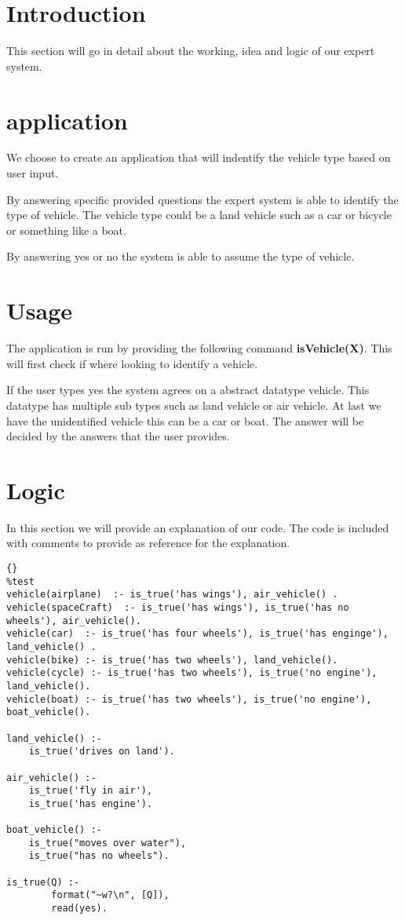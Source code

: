 \section{Introduction} \label{man-introduction}
This section will go in detail about the working, idea and logic of our expert system.

\section{application} \label{man-application}
We choose to create an application that will indentify the vehicle type based on user input.

By answering specific provided questions the expert system is able to identify the type of vehicle.
The vehicle type could be a land vehicle such as a car or bicycle or something like a boat.

By answering yes or no the system is able to assume the type of vehicle.


\section{Usage} \label{man-usage}
The application is run by providing the following command \textbf{isVehicle(X)}.
This will first check if where looking to identify a vehicle.

If the user types yes the system agrees on a abstract datatype vehicle.
This datatype has multiple sub types such as land vehicle or air vehicle. At last we have the unidentified
vehicle this can be a car or boat.
The answer will be decided by the answers that the user provides.

\newpage
\section{Logic} \label{man-logic}
In this section we will provide an explanation of our code.
The code is included with comments to provide as reference for the explanation.




\begin{lstlisting}{}
%test
vehicle(airplane)  :- is_true('has wings'), air_vehicle() .
vehicle(spaceCraft)  :- is_true('has wings'), is_true('has no wheels'), air_vehicle().
vehicle(car)  :- is_true('has four wheels'), is_true('has enginge'), land_vehicle() .
vehicle(bike) :- is_true('has two wheels'), land_vehicle().
vehicle(cycle) :- is_true('has two wheels'), is_true('no engine'), land_vehicle().
vehicle(boat) :- is_true('has two wheels'), is_true('no engine'), boat_vehicle().

land_vehicle() :-
	is_true('drives on land').

air_vehicle() :-
	is_true('fly in air'), 
	is_true('has engine').

boat_vehicle() :-
	is_true("moves over water"),
    is_true("has no wheels").

is_true(Q) :-
        format("~w?\n", [Q]),
        read(yes).
\end{lstlisting}



